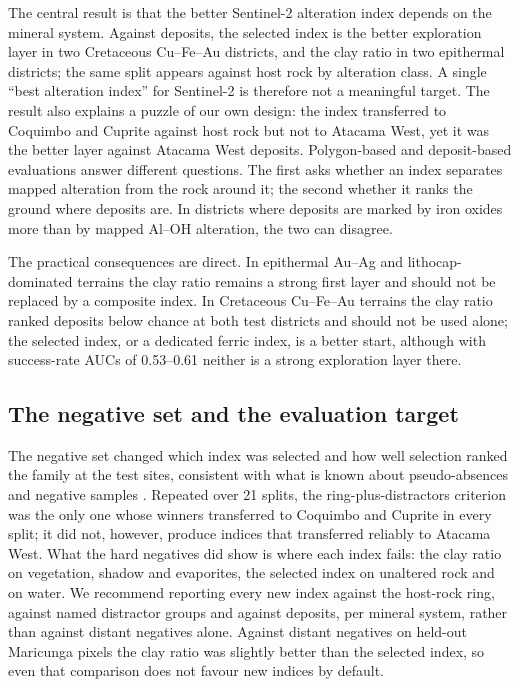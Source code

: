\documentclass[preprint,authoryear,number]{elsarticle}
\begin{document}
The central result is that the better Sentinel-2 alteration index depends on the mineral system. Against deposits, the selected index is the better exploration layer in two Cretaceous Cu--Fe--Au districts, and the clay ratio in two epithermal districts; the same split appears against host rock by alteration class. A single ``best alteration index'' for Sentinel-2 is therefore not a meaningful target. The result also explains a puzzle of our own design: the index transferred to Coquimbo and Cuprite against host rock but not to Atacama West, yet it was the better layer against Atacama West deposits. Polygon-based and deposit-based evaluations answer different questions. The first asks whether an index separates mapped alteration from the rock around it; the second whether it ranks the ground where deposits are. In districts where deposits are marked by iron oxides more than by mapped Al--OH alteration, the two can disagree.

The practical consequences are direct. In epithermal Au--Ag and lithocap-dominated terrains the clay ratio remains a strong first layer and should not be replaced by a composite index. In Cretaceous Cu--Fe--Au terrains the clay ratio ranked deposits below chance at both test districts and should not be used alone; the selected index, or a dedicated ferric index, is a better start, although with success-rate AUCs of 0.53--0.61 neither is a strong exploration layer there.

\subsection{The negative set and the evaluation target}

The negative set changed which index was selected and how well selection ranked the family at the test sites, consistent with what is known about pseudo-absences and negative samples \citep{Phillips2009,BarbetMassin2012,Zuo2020,Zhang2025}. Repeated over 21 splits, the ring-plus-distractors criterion was the only one whose winners transferred to Coquimbo and Cuprite in every split; it did not, however, produce indices that transferred reliably to Atacama West. What the hard negatives did show is where each index fails: the clay ratio on vegetation, shadow and evaporites, the selected index on unaltered rock and on water. We recommend reporting every new index against the host-rock ring, against named distractor groups and against deposits, per mineral system, rather than against distant negatives alone. Against distant negatives on held-out Maricunga pixels the clay ratio was slightly better than the selected index, so even that comparison does not favour new indices by default.
\end{document}
